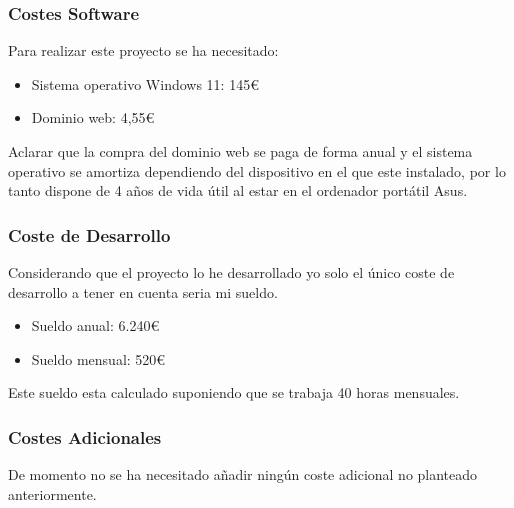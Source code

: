 \subsubsection{Costes Software}
Para realizar este proyecto se ha necesitado:
\begin{itemize}
    \item Sistema operativo Windows 11: 145€
    \item Dominio web: 4,55€
\end{itemize}
Aclarar que la compra del dominio web se paga de forma anual y el sistema operativo se amortiza dependiendo del dispositivo en el que este instalado, por lo tanto dispone de 4 años de vida útil al estar en el ordenador portátil Asus.
\subsubsection{Coste de Desarrollo}
Considerando que el proyecto lo he desarrollado yo solo el único coste de desarrollo a tener en cuenta seria mi sueldo.
\begin{itemize}
    \item Sueldo anual: 6.240€
    \item Sueldo mensual: 520€
\end{itemize}
Este sueldo esta calculado suponiendo que se trabaja 40 horas mensuales.
\subsubsection{Costes Adicionales}
De momento no se ha necesitado añadir ningún coste adicional no planteado anteriormente.
